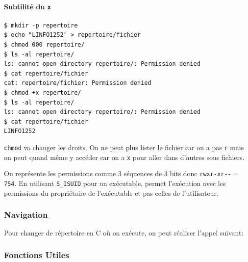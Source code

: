 \paragraph{\texorpdfstring{Subtilité du
\texttt{x}}{Subtilité du x}}\label{subtilituxe9-du-x}

\begin{verbatim}
$ mkdir -p repertoire 
$ echo "LINFO1252" > repertoire/fichier 
$ chmod 000 repertoire/ 
$ ls -al repertoire/
ls: cannot open directory repertoire/: Permission denied 
$ cat repertoire/fichier
cat: repertoire/fichier: Permission denied 
$ chmod +x repertoire/ 
$ ls -al repertoire/
ls: cannot open directory repertoire/: Permission denied
$ cat repertoire/fichier
LINFO1252
\end{verbatim}

\texttt{chmod} va changer les droits. On ne peut plus lister le fichier
car on a pas \texttt{r} mais on peut quand même y accéder car on a
\texttt{x} pour aller dans d'autres sous fichiers.

On représente les permissions comme 3 séquences de 3 bits donc
\texttt{rwxr-xr-\/-} = \texttt{754}. En utilisant \texttt{S\_ISUID} pour
un exécutable, permet l'exécution avec les permissions du propriétaire
de l'exécutable et pas celles de l'utilisateur.

\subsubsection{Navigation}\label{navigation}

Pour changer de répertoire en C où on exécute, on peut réaliser l'appel
suivant:

\begin{Shaded}
\begin{Highlighting}[]
\PreprocessorTok{ }
\OperatorTok{(}  \OperatorTok{*}\OperatorTok{);}
\end{Highlighting}
\end{Shaded}

\subsubsection{Fonctions Utiles}\label{fonctions-utiles}

